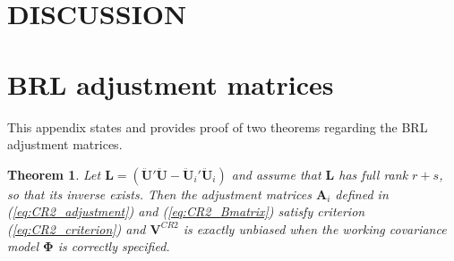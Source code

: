 \documentclass[12pt]{article}\usepackage[]{graphicx}\usepackage[]{color}
\newtheorem{thm}{Theorem}
\newcommand{\bm}{\mathbf}
\newcommand{\bs}{\boldsymbol}
\begin{document}

\section{DISCUSSION}
\label{sec:discussion}




\appendix

\section{BRL adjustment matrices}
\label{app:theorems}

This appendix states and provides proof of two theorems regarding the BRL adjustment matrices. 

\begin{thm}
\label{thm:BRL_FE}
Let $\bm{L} = \left(\bm{\ddot{U}}'\bm{\ddot{U}} - \bm{\ddot{U}}_i'\bm{\ddot{U}}_i\right)$ and assume that $\bm{L}$ has full rank $r + s$, so that its inverse exists. Then the adjustment matrices $\bm{A}_i$ defined in (\ref{eq:CR2_adjustment}) and (\ref{eq:CR2_Bmatrix}) satisfy criterion (\ref{eq:CR2_criterion}) and $\bm{V}^{CR2}$ is exactly unbiased when the working covariance model $\bs\Phi$ is correctly specified.
\end{thm}
\end{document}
